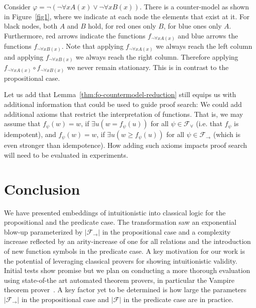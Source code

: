 \documentclass[a4paper,UKenglish,cleveref, autoref, thm-restate]{lipics-v2021}
\begin{document}
\begin{example}
	Consider $\varphi = \neg(\neg \forall xA(x)\vee\neg \forall xB(x))$. There is a counter-model as shown in Figure~\ref{fig1},
	where we indicate at each node the elements that exist at it. For black nodes, both $A$ and $B$ hold, for red ones only $B$, for blue ones only $A$. Furthermore, red arrows indicate the functions $f_{\neg \forall xA(x)}$ and blue arrows the functions $f_{\neg \forall xB(x)}$. Note that applying $f_{\neg \forall xA(x)}$ we always reach the left column and applying $f_{\neg \forall xB(x)}$ we always reach the right column. Therefore applying $f_{\neg \forall xA(x)}\circ f_{\neg \forall xB(x)}$ we never remain stationary. This is in contrast to the propositional case.
\end{example}

Let us add that Lemma~\ref{thm:fo-countermodel-reduction} still equips us with additional information that could be used to guide proof search: We could add additional axioms that restrict the interpretation of functions. That is, we may assume that $f_\psi(w) = w$, if $\exists u(w = f_\psi(u))$ for all $\psi\in\mathcal F_\forall$ (i.e. that $f_\psi$ is idempotent), and $f_\psi(w) = w$, if $\exists u(w \geq f_\psi(u))$ for all $\psi\in\mathcal F_\to$ (which is even stronger than idempotence).
How adding such axioms impacts proof search will need to be evaluated in experiments.

\section{Conclusion}

We have presented embeddings of intuitionistic into classical logic for the propositional and the predicate case.
The transformation saw an exponential blow-up parameterized by $|\mathcal F_\to|$ in the propositional case and a complexity increase reflected by an arity-increase of one for all relations and the introduction of new function symbols in the predicate case.
A key motivation for our work is the potential of leveraging classical provers for showing intuitionistic validity.
Initial tests show promise but we plan on conducting a more thorough evaluation using state-of-the art automated theorem provers, in particular the Vampire theorem prover~\cite{kovacs2013first}.
A key factor yet to be determined is how large the parameters $|\mathcal F_\to|$ in the propositional case and $|\mathcal F|$ in the predicate case are in practice.
\end{document}
